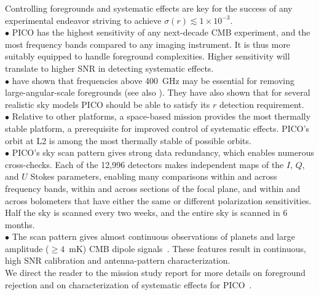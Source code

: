 \documentclass[PICOAPC.tex]{subfiles}
\begin{document}
Controlling foregrounds and systematic effects are key for the success of any experimental endeavor striving to achieve $\sigma(r) \lesssim 1 \times 10^{-3}$. \\
$\bullet$ \hspace{0.1in}  PICO has the highest sensitivity of any next-decade CMB experiment, and the most frequency bands compared to any imaging instrument. It is thus more suitably equipped to handle foreground complexities. Higher sensitivity will translate to higher \ac{SNR} in detecting systematic effects. \\ 
$\bullet$ \hspace{0.1in}  \citet{pico_report} have shown that frequencies above 400~GHz may be essential for removing large-angular-scale foregrounds (see also \citet{hensley_2017}). They have also shown that for several realistic sky models PICO should be able to satisfy its $r$ detection requirement.  \\
$\bullet$ \hspace{0.1in}  Relative to other platforms, a space-based mission provides the most thermally stable platform,  a prerequisite for improved control of systematic effects. PICO's orbit at L2 is among the most thermally stable of possible orbits. \\
$\bullet$ \hspace{0.1in} PICO's sky scan pattern gives strong data redundancy, which enables numerous cross-checks. Each of the 12,996 detectors makes independent maps of the $I,\,Q$, and $U$ Stokes parameters, enabling many comparisons within and across frequency bands, within and across sections of the focal plane, and within and across bolometers that have either the same or different polarization sensitivities. Half the sky is scanned every two weeks, and the entire sky is scanned in 6 months. \\
$\bullet$ \hspace{0.1in}  The scan pattern gives almost continuous observations of planets and large amplitude ($\geq 4$~mK) CMB dipole signals~\citep{picoweb_dipole}. These features result in continuous, high \ac{SNR} calibration and antenna-pattern characterization. \\
We direct the reader to the mission study report for more details on foreground rejection and on characterization of systematic effects for PICO~\citep{pico_report}.
\end{document}
